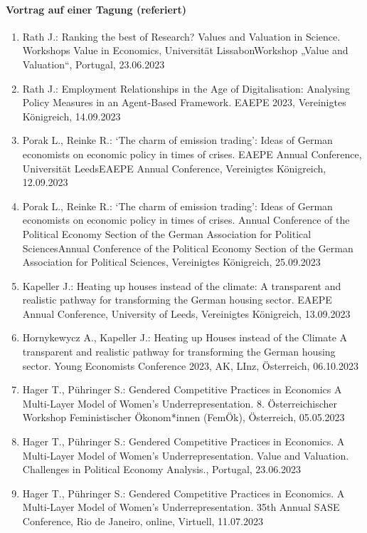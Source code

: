 \paragraph{Vortrag auf einer Tagung (referiert)}
\begin{enumerate}
	\item Rath J.: Ranking the best of Research? Values and Valuation in Science. Workshops Value in Economics, Universität LissabonWorkshop „Value and Valuation“, Portugal, 23.06.2023
	\item Rath J.: Employment Relationships in the Age of Digitalisation: Analysing Policy Measures in an Agent-Based Framework. EAEPE 2023, Vereinigtes Königreich, 14.09.2023
	\item Porak L., Reinke R.: ‘The charm of emission trading’: Ideas of German economists on economic policy in times of crises. EAEPE Annual Conference, Universität LeedsEAEPE Annual Conference, Vereinigtes Königreich, 12.09.2023
	\item Porak L., Reinke R.: ‘The charm of emission trading’: Ideas of German economists on economic policy in times of crises. Annual Conference of the Political Economy Section of the German Association for Political SciencesAnnual Conference of the Political Economy Section of the German Association for Political Sciences, Vereinigtes Königreich, 25.09.2023
	\item Kapeller J.: Heating up houses instead of the climate: A transparent and realistic pathway for transforming the German housing sector. EAEPE Annual Conference, University of Leeds, Vereinigtes Königreich, 13.09.2023
	\item Hornykewycz A., Kapeller J.: Heating up Houses instead of the Climate A transparent and realistic pathway for transforming the German housing sector. Young Economists Conference 2023, AK, LInz, Österreich, 06.10.2023
	\item Hager T., Pühringer S.: Gendered Competitive Practices in Economics A Multi-Layer Model of Women’s Underrepresentation. 8. Österreichischer Workshop Feministischer Ökonom*innen (FemÖk), Österreich, 05.05.2023
	\item Hager T., Pühringer S.: Gendered Competitive Practices in Economics. A Multi-Layer Model of Women’s Underrepresentation. Value and Valuation. Challenges in Political Economy Analysis., Portugal, 23.06.2023
	\item Hager T., Pühringer S.: Gendered Competitive Practices in Economics. A Multi-Layer Model of Women’s Underrepresentation. 35th Annual SASE Conference, Rio de Janeiro, online, Virtuell, 11.07.2023

\end{enumerate}

